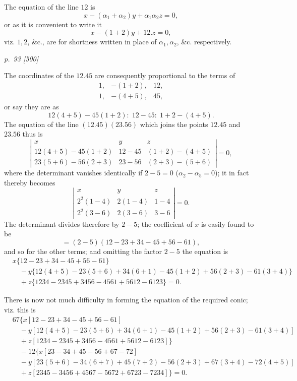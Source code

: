 \documentclass[11pt,a4paper]{article}
\newcommand{\sourcepage}[2]{%
  \bigskip
  \noindent\textit{p.~#1 [#2]}%
  \par\smallskip
}
\newcommand{\Det}[1]{\left|\begin{matrix}#1\end{matrix}\right|}
\begin{document}
The equation of the line $12$ is
\[
x-(\alpha_1+\alpha_2)y+\alpha_1\alpha_2z=0,
\]
or as it is convenient to write it
\[
x-(1+2)y+12.z=0,
\]
viz. $1,2$, \&c., are for shortness written in place of $\alpha_1,\alpha_2$, \&c.
respectively.

\sourcepage{93}{500}
The coordinates of the $12.45$ are consequently proportional to the terms of
\[
\begin{matrix}
1,&-(1+2),&12,\\
1,&-(4+5),&45,
\end{matrix}
\]
or say they are as
\[
12(4+5)-45(1+2):\;12-45:\;1+2-(4+5).
\]
The equation of the line $(12.45)(23.56)$ which joins the points $12.45$ and
$23.56$ thus is
\[
\Det{
x&y&z\\
12(4+5)-45(1+2)&12-45&(1+2)-(4+5)\\
23(5+6)-56(2+3)&23-56&(2+3)-(5+6)}
=0,
\]
where the determinant vanishes identically if $2-5=0$ ($\alpha_2-\alpha_5=0$);
it in fact thereby becomes
\[
\Det{
x&y&z\\
2^2(1-4)&2(1-4)&1-4\\
2^2(3-6)&2(3-6)&3-6}=0.
\]
The determinant divides therefore by $2-5$; the coefficient of $x$ is easily found
to be
\[
=(2-5)(12-23+34-45+56-61),
\]
and so for the other terms; and omitting the factor $2-5$ the equation is
\[
\begin{aligned}
&x\{12-23+34-45+56-61\}\\
&\quad-y\{12(4+5)-23(5+6)+34(6+1)-45(1+2)+56(2+3)-61(3+4)\}\\
&\quad+z\{1234-2345+3456-4561+5612-6123\}=0.
\end{aligned}
\]

There is now not much difficulty in forming the equation of the required conic;
viz. this is
\[
\begin{aligned}
&67\{x[12-23+34-45+56-61]\\
&\quad-y[12(4+5)-23(5+6)+34(6+1)-45(1+2)+56(2+3)-61(3+4)]\\
&\quad+z[1234-2345+3456-4561+5612-6123]\}\\
&\quad-12\{x[23-34+45-56+67-72]\\
&\quad-y[23(5+6)-34(6+7)+45(7+2)-56(2+3)+67(3+4)-72(4+5)]\\
&\quad+z[2345-3456+4567-5672+6723-7234]\}=0.
\end{aligned}
\]
\end{document}
